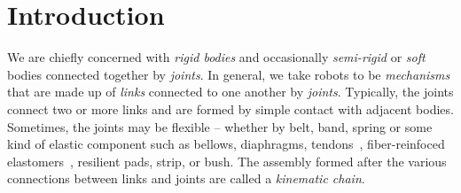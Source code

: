\chapter{Introduction}  
 \label{chap:back}
 
 We are chiefly concerned with \textit{rigid bodies} and occasionally \textit{semi-rigid} or \textit{soft} bodies connected together by \textit{joints}.   In general, we take robots to be \textit{mechanisms} that are made up of \textit{links} connected to one another by \textit{joints}.  Typically, the joints connect two or more links and are formed by simple contact with adjacent bodies.  Sometimes, the joints may be flexible -- whether by belt, band, spring or some kind of elastic component such as bellows, diaphragms, tendons~\cite{Bern17ACM}, fiber-reinfoced elastomers~\cite{BishopFREE2012}, resilient pads, strip, or bush. The assembly formed after the various connections between links and joints are called  a \textit{kinematic chain}. 
 
